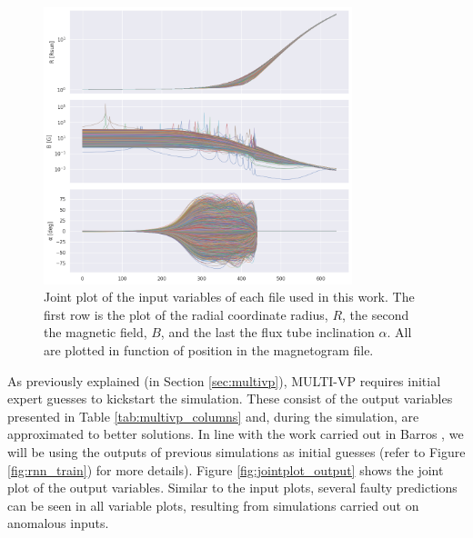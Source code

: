 \begin{figure}
    \centering
    \includegraphics[width=0.8\textwidth]{figures/joint_input_cols.png}
    \caption[Joint plot of the inputs of MULTI-VP]{Joint plot of the input variables of each file used in this work. The first row is the plot of the radial coordinate radius, $R$, the second the magnetic field, $B$, and the last the flux tube inclination $\alpha$. All are plotted in function of position in the magnetogram file.}
    \label{fig:jointplot_input}
\end{figure}

As previously explained (in Section \ref{sec:multivp}), MULTI-VP requires initial expert guesses to kickstart the simulation. These consist of the output variables presented in Table \ref{tab:multivp_columns} and, during the simulation, are approximated to better solutions. In line with the work carried out in Barros \cite{barros_InitialConditionEstimation_}, we will be using the outputs of previous simulations as initial guesses (refer to Figure \ref{fig:rnn_train}) for more details). Figure \ref{fig:jointplot_output} shows the joint plot of the output variables. Similar to the input plots, several faulty predictions can be seen in all variable plots, resulting from simulations carried out on anomalous inputs.

